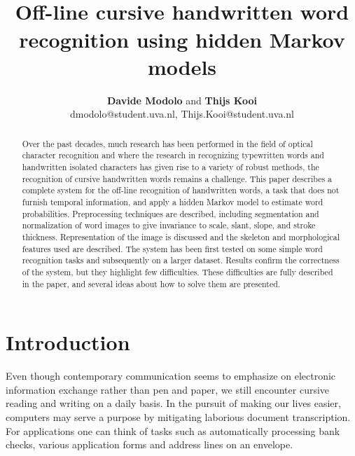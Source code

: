 \documentclass[conference]{IEEEtran}
\begin{document}
\title{\ \\ \LARGE\bf Off-line cursive handwritten word recognition using hidden Markov models}
\author{{\bf Davide Modolo} and {\bf Thijs Kooi}\\ dmodolo@student.uva.nl, Thijs.Kooi@student.uva.nl}
\maketitle

\begin{abstract}
Over the past decades, much research has been performed in the field of optical character recognition and where the research in recognizing typewritten words and handwritten isolated characters has given rise to a variety of robust methods, the recognition of cursive handwritten words remains a challenge. This paper describes a complete system for the off-line recognition of handwritten words, a task that does not furnish temporal information, and apply a hidden Markov model to estimate word probabilities. Preprocessing techniques are described, including segmentation and normalization of word images to give invariance to scale, slant, slope, and stroke thickness. Representation of the image is discussed and the skeleton and morphological features used are described. The system has been first tested on some simple word recognition tasks and subsequently on a larger dataset. Results confirm the correctness of the system, but they highlight few difficulties. These difficulties are fully described in the paper, and several ideas about how to solve them are presented.\\
\end{abstract}

\section{Introduction}
Even though contemporary communication seems to emphasize on electronic information exchange rather than pen and paper, we still encounter cursive reading and writing on a daily basis. In the pursuit of making our lives easier, computers may serve a purpose by mitigating laborious document transcription. For applications one can think of tasks such as automatically processing bank checks, various application forms and address lines on an envelope.
\end{document}
